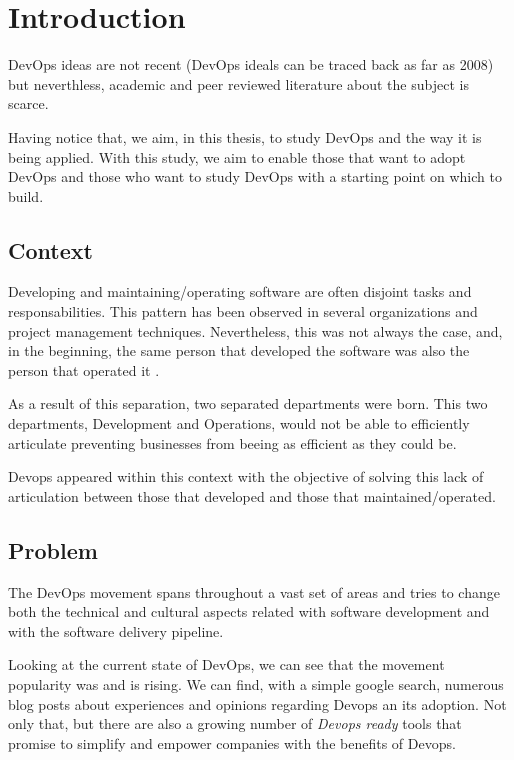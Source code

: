 \chapter{Introduction} \label{chap:introduction}
DevOps ideas are not recent (DevOps ideals can be traced back as far as 2008) but neverthless, academic and peer reviewed literature about the subject is scarce.

Having notice that, we aim, in this thesis, to study DevOps and the way it is being applied. With this study, we aim to enable those that want to adopt DevOps and those who want to study DevOps with a starting point on which to build.

		\section{Context} \label{chap:introduction:sec:context}
		Developing and maintaining/operating software are often disjoint tasks and responsabilities. This pattern has been observed in several organizations and project management techniques. Nevertheless, this was not always the case, and, in the beginning, the same person that developed the software was also the person that operated it \cite{Loukides2012}.

		As a result of this separation, two separated departments were born. This two departments, Development and Operations, would not be able to efficiently articulate preventing businesses from beeing as efficient as they could be.

		Devops appeared within this context with the objective of solving this lack of articulation between those that developed and those that maintained/operated.

		\section{Problem} \label{chap:introduction:sec:problem}

		The DevOps movement spans throughout a vast set of areas and tries to change both the technical and cultural aspects related with software development and with the software delivery pipeline.

		Looking at the current state of DevOps, we can see that the movement popularity was and is rising. We can find, with a simple google search, numerous blog posts about experiences and opinions regarding Devops an its adoption. Not only that, but there are also a growing number of \textit{Devops ready} tools that promise to simplify and empower companies with the benefits of Devops.


